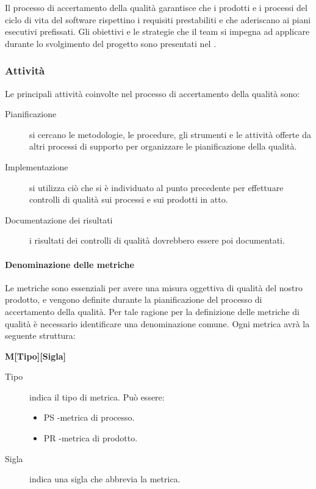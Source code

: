 \documentclass[../norme-di-progetto.tex]{subfiles}
\begin{document}
Il processo di accertamento della qualità garantisce che i prodotti e i processi del ciclo di vita del software rispettino i requisiti prestabiliti e che aderiscano ai piani esecutivi prefissati.
Gli obiettivi e le strategie che il team si impegna ad applicare durante lo svolgimento del progetto sono presentati nel .

\subsubsection{Attività}%
\label{subs:accertamento_della_qualita/attivita}

Le principali attività coinvolte nel processo di accertamento della qualità sono:

\begin{description}
  \item [Pianificazione] si cercano le metodologie, le procedure, gli strumenti e le attività offerte da altri processi di supporto per organizzare le pianificazione della qualità.
  \item [Implementazione] si utilizza ciò che si è individuato al punto precedente per effettuare controlli di qualità sui processi e sui prodotti in atto.
  \item [Documentazione dei risultati] i risultati dei controlli di qualità dovrebbero essere poi documentati.
\end{description}

\paragraph{Denominazione delle metriche}%
\label{par:denominazione_delle_metriche}

Le metriche sono essenziali per avere una misura oggettiva di qualità del nostro prodotto, e vengono definite durante la pianificazione del processo di accertamento della qualità.
Per tale ragione per la definizione delle metriche di qualità è necessario identificare una denominazione comune.
Ogni metrica avrà la seguente struttura:
\begin{center}
  \textbf{M[Tipo][Sigla]}
\end{center}
\begin{description}
  \item [Tipo] indica il tipo di metrica. Può essere:
        \begin{itemize}
          \item PS -metrica di processo.
          \item PR -metrica di prodotto.
        \end{itemize}
  \item [Sigla] indica una sigla che abbrevia la metrica.
\end{description}
\end{document}
